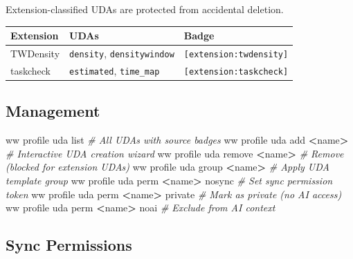\documentclass[
]{article}
\newenvironment{Shaded}{\begin{snugshade}}{\end{snugshade}}
\newcommand{\CommentTok}[1]{\textcolor[rgb]{0.56,0.35,0.01}{\textit{#1}}}
\newcommand{\ExtensionTok}[1]{#1}
\newcommand{\NormalTok}[1]{#1}
\newcommand{\OperatorTok}[1]{\textcolor[rgb]{0.81,0.36,0.00}{\textbf{#1}}}
\newcounter{none} %
\begin{document}
Extension-classified UDAs are protected from accidental deletion.

{\def\LTcaptype{none} %
\begin{longtable}[]{@{}lll@{}}
\toprule\noalign{}
Extension & UDAs & Badge \\
\midrule\noalign{}
\endhead
\bottomrule\noalign{}
\endlastfoot
TWDensity & \texttt{density}, \texttt{densitywindow} &
\texttt{{[}extension:twdensity{]}} \\
taskcheck & \texttt{estimated}, \texttt{time\_map} &
\texttt{{[}extension:taskcheck{]}} \\
\end{longtable}
}

\subsection{Management}\label{management}

\begin{Shaded}
\begin{Highlighting}[]
\ExtensionTok{ww}\NormalTok{ profile uda list                         }\CommentTok{\# All UDAs with source badges}
\ExtensionTok{ww}\NormalTok{ profile uda add }\OperatorTok{\textless{}}\NormalTok{name}\OperatorTok{\textgreater{}}                   \CommentTok{\# Interactive UDA creation wizard}
\ExtensionTok{ww}\NormalTok{ profile uda remove }\OperatorTok{\textless{}}\NormalTok{name}\OperatorTok{\textgreater{}}               \CommentTok{\# Remove (blocked for extension UDAs)}
\ExtensionTok{ww}\NormalTok{ profile uda group }\OperatorTok{\textless{}}\NormalTok{name}\OperatorTok{\textgreater{}}                \CommentTok{\# Apply UDA template group}
\ExtensionTok{ww}\NormalTok{ profile uda perm }\OperatorTok{\textless{}}\NormalTok{name}\OperatorTok{\textgreater{}}\NormalTok{ nosync          }\CommentTok{\# Set sync permission token}
\ExtensionTok{ww}\NormalTok{ profile uda perm }\OperatorTok{\textless{}}\NormalTok{name}\OperatorTok{\textgreater{}}\NormalTok{ private         }\CommentTok{\# Mark as private (no AI access)}
\ExtensionTok{ww}\NormalTok{ profile uda perm }\OperatorTok{\textless{}}\NormalTok{name}\OperatorTok{\textgreater{}}\NormalTok{ noai            }\CommentTok{\# Exclude from AI context}
\end{Highlighting}
\end{Shaded}

\subsection{Sync Permissions}\label{sync-permissions}
\end{document}
